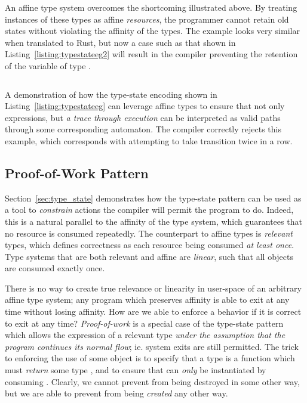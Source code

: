 An affine type system overcomes the shortcoming illustrated above. By treating instances of these types as affine \textit{resources}, the programmer cannot retain old states without violating the affinity of the types. The example looks very similar when translated to Rust, but now a case such as that shown in Listing~\ref{listing:typestateeg2} will result in the compiler preventing the retention of the variable of type .

\begin{listing}[ht]
	\inputminted[]{rust}{typestate_eg2.rs}
	\caption[Type state automaton in Rust with execution traces as runs.]{A demonstration of how the type-state encoding shown in Listing~\ref{listing:typestateeg} can leverage affine types to ensure that not only expressions, but \textit{a trace through execution} can be interpreted as valid paths through some corresponding automaton. The compiler correctly rejects this example, which corresponds with attempting to take transition  twice in a row.}
	\label{listing:typestateeg2}
\end{listing}

\subsection{Proof-of-Work Pattern}
\label{sec:proof_of_work}
Section~\ref{sec:type_state} demonstrates how the type-state pattern can be used as a tool to \textit{constrain} actions the compiler will permit the program to do. Indeed, this is a natural parallel to the affinity of the type system, which guarantees that no resource is consumed repeatedly. The counterpart to affine types is \textit{relevant} types, which defines correctness as each resource being consumed \textit{at least once}. Type systems that are both relevant and affine are \textit{linear}, such that all objects are consumed exactly once.

There is no way to create true relevance or linearity in user-space of an arbitrary affine type system; any program which preserves affinity is able to exit at any time without losing affinity. How are we able to enforce a behavior if it is correct to exit at any time? \textit{Proof-of-work} is a special case of the type-state pattern which allows the expression of a relevant type \textit{under the assumption that the program continues its normal flow}; ie. system exits are still permitted. The trick to enforcing the use of some object  is to specify that a type is a function which must \textit{return} some type , and to ensure that  can \textit{only} be instantiated by consuming . Clearly, we cannot prevent  from being destroyed in some other way, but we are able to prevent  from being \textit{created} any other way.

